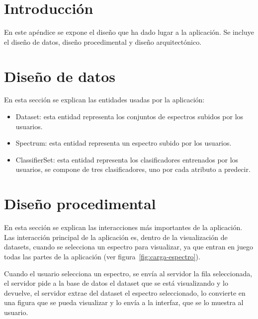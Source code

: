 
\section{Introducción}

En este apéndice se expone el diseño que ha dado lugar a la aplicación. Se 
incluye el diseño de datos, diseño procedimental y diseño arquitectónico.

\section{Diseño de datos}

En esta sección se explican las entidades usadas por la aplicación:

\begin{itemize}
	\item Dataset: esta entidad representa los conjuntos de espectros subidos 
	por los usuarios.
	\item Spectrum: esta entidad representa un espectro subido por los usuarios.
	\item ClassifierSet: esta entidad representa los clasificadores entrenados 
	por los usuarios, se compone de tres clasificadores, uno por cada atributo 
	a predecir.
\end{itemize}


\section{Diseño procedimental}

En esta sección se explican las interacciones más importantes de la aplicación. 
Las interacción principal de la aplicación es, dentro de la visualización de 
datasets, cuando se selecciona un espectro para visualizar, ya que entran en 
juego todas las partes de la aplicación (ver figura~\ref{fig:carga-espectro}).


Cuando el usuario selecciona un espectro, se envía al servidor la fila 
seleccionada, el servidor pide a la base de datos el dataset que se está 
visualizando y lo devuelve, el servidor extrae del dataset el espectro 
seleccionado, lo convierte en una figura que se pueda visualizar y lo envía a 
la interfaz, que se lo muestra al usuario.

